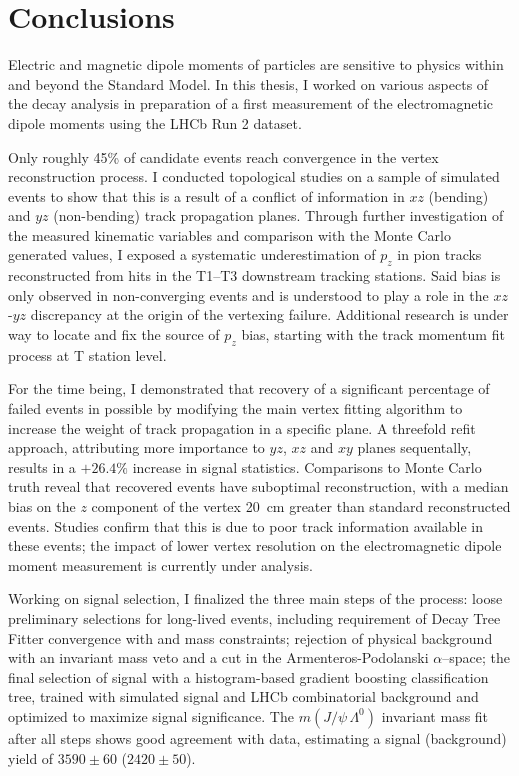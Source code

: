 \chapter*{Conclusions}

Electric and magnetic dipole moments of particles are sensitive to physics within and beyond the Standard Model.
In this thesis, I worked on various aspects of the \demonstratorfull decay analysis in preparation of a first measurement of the \lz electromagnetic dipole moments using the LHCb Run 2 dataset.

Only roughly 45\% of candidate \lambdadecay events reach convergence in the vertex reconstruction process.
I conducted topological studies on a sample of simulated events to show that this is a result of a conflict of information in $xz$ (bending) and $yz$ (non-bending) track propagation planes.
Through further investigation of the measured kinematic variables and comparison with the Monte Carlo generated values, I exposed a systematic underestimation of $p_z$ in pion tracks reconstructed from hits in the T1--T3 downstream tracking stations.
Said bias is only observed in non-converging \lambdadecay events and is understood to play a role in the $xz$-$yz$ discrepancy at the origin of the vertexing failure.
Additional research is under way to locate and fix the source of $p_z$ bias, starting with the track momentum fit process at T station level.

For the time being, I demonstrated that recovery of a significant percentage of failed events in possible by modifying the main vertex fitting algorithm to increase the weight of track propagation in a specific plane.
A threefold refit approach, attributing more importance to $yz$, $xz$ and $xy$ planes sequentally, results in a $+26.4\%$ increase in signal statistics.
Comparisons to Monte Carlo truth reveal that recovered events have suboptimal reconstruction, with a median bias on the $z$ component of the \lambdadecay vertex \SI{20}{\centi\meter} greater than standard reconstructed events.
Studies confirm that this is due to poor track information available in these events;
the impact of lower vertex resolution on the \lz electromagnetic dipole moment measurement
is currently under analysis.

Working on \demonstratorshort signal selection, I finalized the three main steps of the process:
loose preliminary selections for long-lived \lz events, including requirement of Decay Tree Fitter convergence with \jpsi and \lz mass constraints;
rejection of \physbkgshort physical background with an invariant mass veto and a cut in the Armenteros-Podolanski $\alpha$--\pt space;
the final selection of signal with a histogram-based gradient boosting classification tree, trained with simulated signal and LHCb combinatorial background and optimized to maximize \demonstratorshort signal significance.
The $m(J/\psi\,\Lambda^0)$ invariant mass fit after all steps shows good agreement with data, estimating a signal (background) yield of $3590 \pm 60$ ($2420 \pm 50$).

